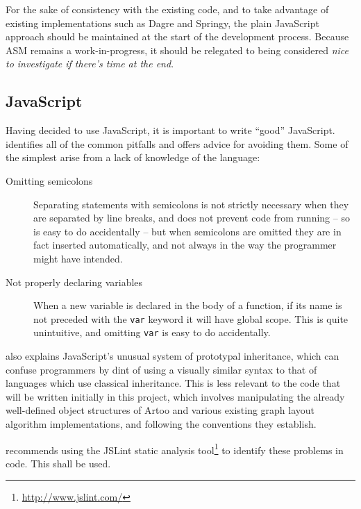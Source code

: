 For the sake of consistency with the existing code, and to take advantage of existing implementations such as Dagre and Springy, the plain JavaScript approach should be maintained at the start of the development process. Because ASM remains a work-in-progress, it should be relegated to being considered \emph{nice to investigate if there's time at the end}.



\subsection{JavaScript}

Having decided to use JavaScript, it is important to write ``good'' JavaScript. 
\citet{Crockford:2008:JGP:1386753} identifies all of the common pitfalls and offers advice for avoiding them.
Some of the simplest arise from a lack of knowledge of the language: 

\begin{description}
    \item[Omitting semicolons]
    Separating statements with semicolons is not strictly necessary when they are separated by line breaks, and does not prevent code from running -- so is easy to do accidentally -- but when semicolons are omitted they are in fact inserted automatically, and not always in the way the programmer might have intended.
    \item[Not properly declaring variables]
    When a new variable is declared in the body of a function, if its name is not preceded with the \texttt{var} keyword it will have global scope. This is quite unintuitive, and omitting \texttt{var} is easy to do accidentally.
\end{description}

\citeauthor{Crockford:2008:JGP:1386753} also explains JavaScript's unusual system of prototypal inheritance, which can confuse programmers by dint of using a visually similar syntax to that of languages which use classical inheritance. This is less relevant to the code that will be written initially in this project, which involves manipulating the already well-defined object structures of Artoo and various existing graph layout algorithm implementations, and following the conventions they establish.

\citeauthor{Crockford:2008:JGP:1386753} recommends using the JSLint static analysis tool\footnote{\url{http://www.jslint.com/}} to identify these problems in code. This shall be used.


